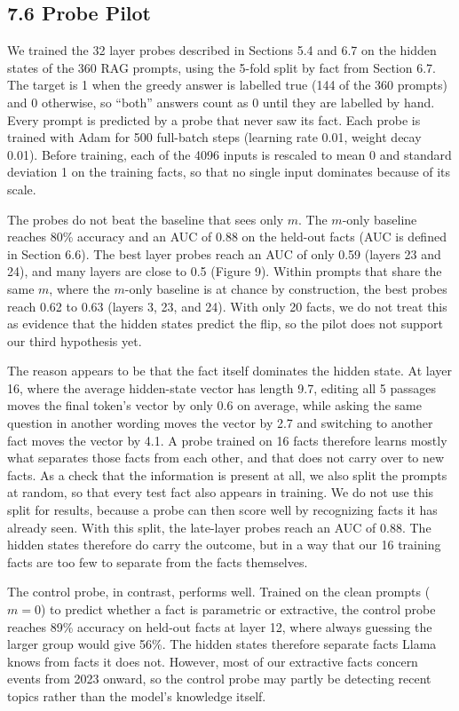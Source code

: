 \documentclass[
  12pt,
  letterpaper,
]{article}
\begin{document}
\subsection{7.6 Probe Pilot}\label{probe-pilot}

We trained the 32 layer probes described in
Sections 5.4 and 6.7 on the hidden states of the
360 RAG prompts, using the 5-fold split by fact
from Section 6.7. The target is 1 when the greedy
answer is labelled true (144 of the 360 prompts)
and 0 otherwise, so ``both'' answers count as 0
until they are labelled by hand. Every prompt is
predicted by a probe that never saw its fact. Each
probe is trained with Adam for 500 full-batch
steps (learning rate 0.01, weight decay 0.01).
Before training, each of the 4096 inputs is
rescaled to mean 0 and standard deviation 1 on the
training facts, so that no single input dominates
because of its scale.

The probes do not beat the baseline that sees only
\(m\). The \(m\)-only baseline reaches 80\%
accuracy and an AUC of 0.88 on the held-out facts
(AUC is defined in Section 6.6). The best layer
probes reach an AUC of only 0.59 (layers 23 and
24), and many layers are close to 0.5 (Figure 9).
Within prompts that share the same \(m\), where
the \(m\)-only baseline is at chance by
construction, the best probes reach 0.62 to 0.63
(layers 3, 23, and 24). With only 20 facts, we do
not treat this as evidence that the hidden states
predict the flip, so the pilot does not support
our third hypothesis yet.

The reason appears to be that the fact itself
dominates the hidden state. At layer 16, where the
average hidden-state vector has length 9.7,
editing all 5 passages moves the final token's
vector by only 0.6 on average, while asking the
same question in another wording moves the vector
by 2.7 and switching to another fact moves the
vector by 4.1. A probe trained on 16 facts
therefore learns mostly what separates those facts
from each other, and that does not carry over to
new facts. As a check that the information is
present at all, we also split the prompts at
random, so that every test fact also appears in
training. We do not use this split for results,
because a probe can then score well by recognizing
facts it has already seen. With this split, the
late-layer probes reach an AUC of 0.88. The hidden
states therefore do carry the outcome, but in a
way that our 16 training facts are too few to
separate from the facts themselves.

The control probe, in contrast, performs well.
Trained on the clean prompts (\(m = 0\)) to
predict whether a fact is parametric or
extractive, the control probe reaches 89\%
accuracy on held-out facts at layer 12, where
always guessing the larger group would give 56\%.
The hidden states therefore separate facts Llama
knows from facts it does not. However, most of our
extractive facts concern events from 2023 onward,
so the control probe may partly be detecting
recent topics rather than the model's knowledge
itself.
\end{document}
